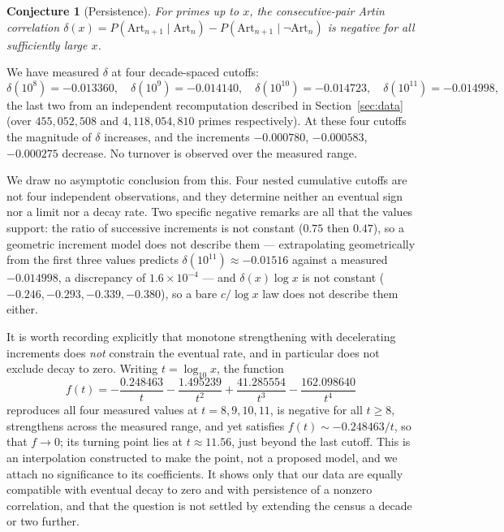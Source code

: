 \documentclass[11pt]{amsart}
\newtheorem{conjecture}{Conjecture}
\theoremstyle{definition}
\newcommand{\Art}{\mathrm{Art}}
\begin{document}
\begin{conjecture}[Persistence]
	\label{conj:persist}
	For primes up to $x$, the consecutive-pair Artin correlation
	$\delta(x) = P(\Art_{n+1} \mid \Art_n) - P(\Art_{n+1} \mid \lnot\Art_n)$
	is negative for all sufficiently large $x$.
\end{conjecture}

We have measured $\delta$ at four decade-spaced cutoffs:
\[
  \delta(10^8) = -0.013360, \quad
  \delta(10^9) = -0.014140, \quad
  \delta(10^{10}) = -0.014723, \quad
  \delta(10^{11}) = -0.014998 ,
\]
the last two from an independent recomputation described in
Section~\ref{sec:data} (over $455{,}052{,}508$ and $4{,}118{,}054{,}810$
primes respectively). At these four cutoffs the magnitude of $\delta$
increases, and the increments $-0.000780$, $-0.000583$, $-0.000275$ decrease.
No turnover is observed over the measured range.

We draw no asymptotic conclusion from this. Four nested cumulative cutoffs are
not four independent observations, and they determine neither an eventual sign
nor a limit nor a decay rate. Two specific negative remarks are all that the
values support: the ratio of successive increments is not constant ($0.75$
then $0.47$), so a geometric increment model does not describe them ---
extrapolating geometrically from the first three values predicts
$\delta(10^{11}) \approx -0.01516$ against a measured $-0.014998$, a
discrepancy of $1.6 \times 10^{-4}$ --- and $\delta(x)\log x$ is not constant
($-0.246, -0.293, -0.339, -0.380$), so a bare $c/\log x$ law does not describe
them either.

It is worth recording explicitly that monotone strengthening with decelerating
increments does \emph{not} constrain the eventual rate, and in particular does
not exclude decay to zero. Writing $t = \log_{10} x$, the function
\[
  f(t) = -\frac{0.248463}{t} - \frac{1.495239}{t^2}
         + \frac{41.285554}{t^3} - \frac{162.098640}{t^4}
\]
reproduces all four measured values at $t = 8, 9, 10, 11$, is negative for all
$t \ge 8$, strengthens across the measured range, and yet satisfies
$f(t) \sim -0.248463/t$, so that $f \to 0$; its turning point lies at
$t \approx 11.56$, just beyond the last cutoff. This is an interpolation
constructed to make the point, not a proposed model, and we attach no
significance to its coefficients. It shows only that our data are equally
compatible with eventual decay to zero and with persistence of a nonzero
correlation, and that the question is not settled by extending the census a
decade or two further.
\end{document}
